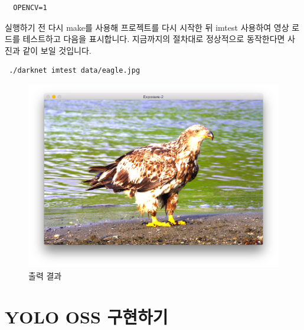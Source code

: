 \documentclass{article}
\begin{document}
\begin{lstlisting}
  OPENCV=1 
\end{lstlisting}
실행하기 전 다시 make를 사용해 프로젝트를 다시 시작한 뒤 imtest 사용하여 영상 로드를 테스트하고 다음을 표시합니다. 지금까지의 절차대로 정상적으로 동작한다면 사진과 같이 보일 것입니다.
\begin{lstlisting}
 ./darknet imtest data/eagle.jpg 
\end{lstlisting}

\begin{figure}[h!]
\centering
\includegraphics[scale=0.4]{egle.png}
\caption{출력 결과}
\label{fig:detect} 
\end{figure}


\section{YOLO OSS 구현하기}
\end{document}
